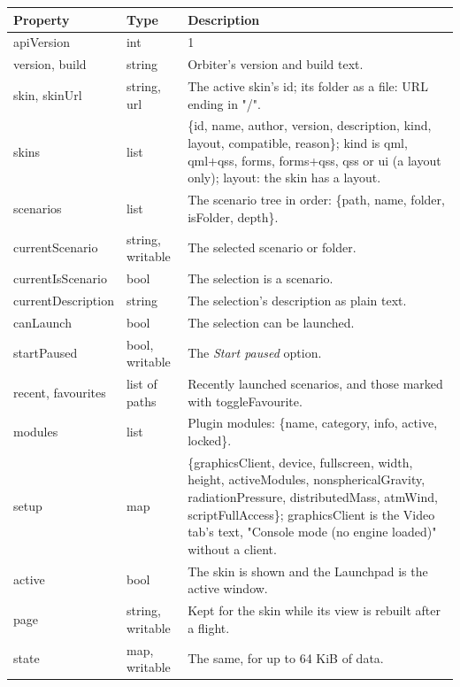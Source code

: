 \documentclass[Orbiter Developer Manual.tex]{subfiles}
\begin{document}
\begin{sloppypar}
	\begin{longtable}{ |p{}|p{}|p{}| }
	\hline\rule{0pt}{2ex}
	\textbf{Property} & \textbf{Type} & \textbf{Description}\\
	\hline\rule{0pt}{2ex}
	apiVersion & int & 1\\
	\hline\rule{0pt}{2ex}
	version, build & string & Orbiter's version and build text.\\
	\hline\rule{0pt}{2ex}
	skin, skinUrl & string, url & The active skin's id; its folder as a file: URL ending in "/".\\
	\hline\rule{0pt}{2ex}
	skins & list & \{id, name, author, version, description, kind, layout, compatible, reason\}; kind is qml, qml+qss, forms, forms+qss, qss or ui (a layout only); layout: the skin has a layout.\\
	\hline\rule{0pt}{2ex}
	scenarios & list & The scenario tree in order: \{path, name, folder, isFolder, depth\}.\\
	\hline\rule{0pt}{2ex}
	currentScenario & string, writable & The selected scenario or folder.\\
	\hline\rule{0pt}{2ex}
	currentIsScenario & bool & The selection is a scenario.\\
	\hline\rule{0pt}{2ex}
	currentDescription & string & The selection's description as plain text.\\
	\hline\rule{0pt}{2ex}
	canLaunch & bool & The selection can be launched.\\
	\hline\rule{0pt}{2ex}
	startPaused & bool, writable & The \textit{Start paused} option.\\
	\hline\rule{0pt}{2ex}
	recent, favourites & list of paths & Recently launched scenarios, and those marked with toggleFavourite.\\
	\hline\rule{0pt}{2ex}
	modules & list & Plugin modules: \{name, category, info, active, locked\}.\\
	\hline\rule{0pt}{2ex}
	setup & map & \{graphicsClient, device, fullscreen, width, height, activeModules, nonsphericalGravity, radiationPressure, distributedMass, atmWind, scriptFullAccess\}; graphicsClient is the Video tab's text, "Console mode (no engine loaded)" without a client.\\
	\hline\rule{0pt}{2ex}
	active & bool & The skin is shown and the Launchpad is the active window.\\
	\hline\rule{0pt}{2ex}
	page & string, writable & Kept for the skin while its view is rebuilt after a flight.\\
	\hline\rule{0pt}{2ex}
	state & map, writable & The same, for up to 64 KiB of data.\\
	\hline
	\end{longtable}


\end{sloppypar}
\end{document}
